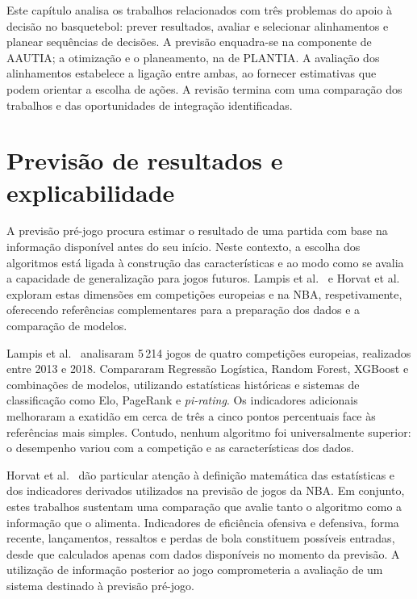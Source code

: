 Este capítulo analisa os trabalhos relacionados com três problemas do
apoio à decisão no basquetebol: prever resultados, avaliar e selecionar
alinhamentos e planear sequências de decisões. A previsão enquadra-se na
componente de AAUTIA; a otimização e o planeamento, na de PLANTIA. A
avaliação dos alinhamentos estabelece a ligação entre ambas, ao fornecer
estimativas que podem orientar a escolha de ações. A revisão termina com
uma comparação dos trabalhos e das oportunidades de integração identificadas.

\section{Previsão de resultados e explicabilidade}
\label{aautia:estado-da-arte-de-aautia}

A previsão pré-jogo procura estimar o resultado de uma partida com base
na informação disponível antes do seu início. Neste contexto, a escolha
dos algoritmos está ligada à construção das características e ao modo
como se avalia a capacidade de generalização para jogos futuros.
Lampis et al.~\cite{lampis2023} e Horvat et al.~\cite{horvat2023}
exploram estas dimensões em competições europeias e na NBA,
respetivamente, oferecendo referências complementares para a preparação
dos dados e a comparação de modelos.

Lampis et al.~\cite{lampis2023} analisaram 5\,214 jogos de quatro
competições europeias, realizados entre 2013 e 2018. Compararam Regressão
Logística, Random Forest, XGBoost e combinações de modelos, utilizando
estatísticas históricas e sistemas de classificação como Elo, PageRank
e \emph{pi-rating}. Os indicadores adicionais melhoraram a exatidão em
cerca de três a cinco pontos percentuais face às referências mais
simples. Contudo, nenhum algoritmo foi universalmente superior: o
desempenho variou com a competição e as características dos dados.

Horvat et al.~\cite{horvat2023} dão particular atenção à definição
matemática das estatísticas e dos indicadores derivados utilizados na
previsão de jogos da NBA. Em conjunto, estes trabalhos sustentam uma
comparação que avalie tanto o algoritmo como a informação que o alimenta.
Indicadores de eficiência ofensiva e defensiva, forma recente,
lançamentos, ressaltos e perdas de bola constituem possíveis entradas,
desde que calculados apenas com dados disponíveis no momento da previsão.
A utilização de informação posterior ao jogo comprometeria a avaliação
de um sistema destinado à previsão pré-jogo.

